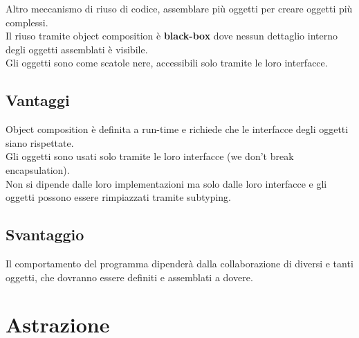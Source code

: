 \documentclass{article}
\begin{document}
Altro meccanismo di riuso di codice, assemblare più oggetti per creare oggetti più complessi.\\
Il riuso tramite object composition è \textbf{black-box} dove nessun dettaglio interno degli oggetti assemblati è visibile.\\
Gli oggetti sono come scatole nere, accessibili solo tramite le loro interfacce.\\

\subsection*{Vantaggi}

Object composition è definita a run-time e richiede che le interfacce degli oggetti siano rispettate.\\
Gli oggetti sono usati solo tramite le loro interfacce (we don’t break encapsulation).\\
Non si dipende dalle loro implementazioni ma solo dalle loro interfacce e gli oggetti possono essere rimpiazzati tramite subtyping.

\subsection*{Svantaggio}

Il comportamento del programma dipenderà dalla collaborazione di diversi e tanti oggetti, che dovranno essere definiti e assemblati a dovere.

\section*{Astrazione}
\end{document}
